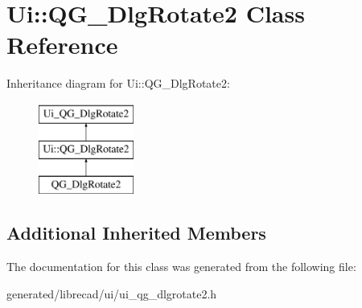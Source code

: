 \hypertarget{classUi_1_1QG__DlgRotate2}{\section{Ui\-:\-:Q\-G\-\_\-\-Dlg\-Rotate2 Class Reference}
\label{classUi_1_1QG__DlgRotate2}
}
Inheritance diagram for Ui\-:\-:Q\-G\-\_\-\-Dlg\-Rotate2\-:\begin{figure}[H]
\begin{center}
\leavevmode
\includegraphics[height=3.000000cm]{classUi_1_1QG__DlgRotate2}
\end{center}
\end{figure}
\subsection*{Additional Inherited Members}


The documentation for this class was generated from the following file\-:\begin{DoxyCompactItemize}
\item 
generated/librecad/ui/ui\-\_\-qg\-\_\-dlgrotate2.\-h\end{DoxyCompactItemize}
